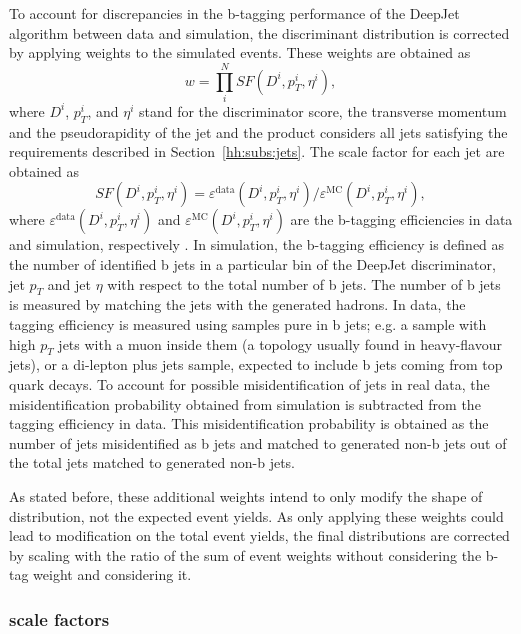 \documentclass[../main.tex]{subfiles}
\begin{document}
To account for discrepancies in the b-tagging performance of the DeepJet algorithm between data and simulation, the discriminant distribution is corrected by applying weights to the simulated events. These weights are obtained as
\begin{equation}
\label{hh:eq:btag_sf}
w = \prod_i^{N} SF(D^i, p_T^i, \eta^i),
\end{equation}
where $D^i$, $p_T^i$, and $\eta^i$ stand for the discriminator score, the transverse momentum and the pseudorapidity of the jet and the product  considers all jets satisfying the requirements described in Section~\ref{hh:subs:jets}. The scale factor for each jet are obtained as
\begin{equation}
SF(D^i, p_T^i, \eta^i) = \varepsilon^\text{data}(D^i, p_T^i, \eta^i)/\varepsilon^\text{MC}(D^i, p_T^i, \eta^i),
\end{equation}
where $\varepsilon^\text{data}(D^i, p_T^i, \eta^i)$ and $\varepsilon^\text{MC}(D^i, p_T^i, \eta^i)$ are the b-tagging efficiencies in data and simulation, respectively \cite{hh:analysis:btag}. In simulation, the b-tagging efficiency is defined as the number of identified b jets in a particular bin of the DeepJet discriminator, jet $p_T$ and jet $\eta$ with respect to the total number of b jets. The number of b jets is measured by matching the jets with the generated hadrons. In data, the tagging efficiency is measured using samples pure in b jets; e.g. a sample with high $p_T$ jets with a muon inside them (a topology usually found in heavy-flavour jets), or a di-lepton plus jets sample, expected to include b jets coming from top quark decays. To account for possible misidentification of jets in real data, the misidentification probability obtained from simulation is subtracted from the tagging efficiency in data. This misidentification probability is obtained as the number of jets misidentified as b jets and matched to generated non-b jets out of the total jets matched to generated non-b jets.

As stated before, these additional weights intend to only modify the shape of distribution, not the expected event yields. As only applying these weights could lead to modification on the total event yields, the final distributions are corrected by scaling with the ratio of the sum of event weights without considering the b-tag weight and considering it.

\subsubsection*{\deeptau{} scale factors}
\end{document}
